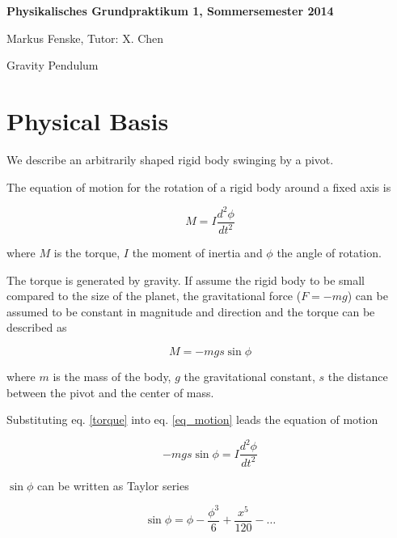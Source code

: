\documentclass[a4paper,german,12pt,smallheadings]{scrartcl}
\begin{document}
\allowdisplaybreaks %
\begin{center}
\bfseries %
\sffamily %
\vspace{-40pt}
Physikalisches Grundpraktikum 1, Sommersemester 2014

Markus Fenske, Tutor: X. Chen

Gravity Pendulum
\vspace{-10pt}
\end{center}

\section*{Physical Basis}

We describe an arbitrarily shaped rigid body swinging by a pivot.

The equation of motion for the rotation of a rigid body around a fixed axis is

\begin{equation}
  M = I \frac{d^2 \phi}{d t^2}
  \label{eq_motion}
\end{equation}

where $M$ is the torque, $I$ the moment of inertia and $\phi$ the angle of rotation.

The torque is generated by gravity. If assume the rigid body to be small
compared to the size of the planet, the gravitational force ($F = -mg$) can be
assumed to be constant in magnitude and direction  and the torque can be
described as

\begin{equation}
  M = -mg s \sin \phi
  \label{torque}
\end{equation}

where $m$ is the mass of the body, $g$ the gravitational constant, $s$ the
distance between the pivot and the center of mass.

Substituting eq. \ref{torque} into eq. \ref{eq_motion} leads the equation of
motion

\begin{equation}
  -mg s \sin \phi = I \frac{d^2 \phi}{d t^2}
\end{equation}

$\sin \phi$ can be written as Taylor series

\begin{equation}
  \sin \phi = \phi - \frac{\phi^3}{6} + \frac{x^5}{120} - \dots
\end{equation}
\end{document}
